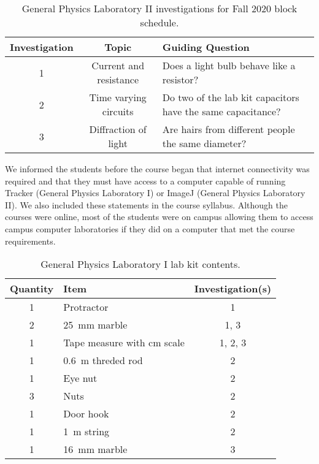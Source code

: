 \documentclass[aip, numerical, preprint]{revtex4-2}
\begin{document}
\begin{table}
    \caption{\label{tab: 1261 fall} General Physics Laboratory II investigations for Fall 2020 block schedule.}
    \begin{ruledtabular}
        \begin{tabular}{ccp{26em}}
            Investigation & Topic & Guiding Question\\
            \hline
            1 & Current and resistance & Does a light bulb behave like a resistor? \\
            2 & Time varying circuits & Do two of the lab kit capacitors have the same capacitance? \\
            3 & Diffraction of light & Are hairs from different people the same diameter?
        \end{tabular}
    \end{ruledtabular}
\end{table}

We informed the students before the course began that internet connectivity was required and that they must have access to a computer capable of running Tracker (General Physics Laboratory I) or ImageJ (General Physics Laboratory II). We also included these statements in the course syllabus. Although the courses were online, most of the students were on campus allowing them to access campus computer laboratories if they did on a computer that met the course requirements.
  
 \begin{table}
    \caption{\label{tab: 1251 lab kit} General Physics Laboratory I lab kit contents.}
        \begin{tabular}{clc}
            \hline\hline
            Quantity & Item & Investigation(s)\\
            \hline
            1 & Protractor & 1 \\
            2 & \SI{25}{mm} marble & 1, 3 \\
            1 & Tape measure with cm scale & 1, 2, 3\\
            1 & \SI{0.6}{m} threded rod & 2 \\
            1 & Eye nut & 2 \\
            3 & Nuts & 2 \\
            1 & Door hook & 2 \\
            1 & \SI{1}{m} string & 2 \\
            1 & \SI{16}{mm} marble & 3 \\
            \hline\hline
        \end{tabular}
\end{table}
\end{document}
